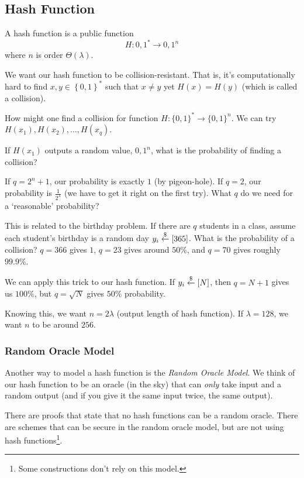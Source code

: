 \subsection{Hash Function}
A hash function is a public function
\[H: {0, 1}^*\to {0, 1}^n\]
where $n$ is order $\Theta(\lambda)$.


We want our hash function to be collision-resistant. That is, it's computationally hard to find $x, y\in\left\{ 0, 1 \right\}^*$ such that $x\neq y$ yet $H(x) = H(y)$ (which is called a collision).

How might one find a collision for function $H: \{ 0, 1 \}^*\to \{ 0, 1 \}^n$. We can try $H(x_1), H(x_2), \dots, H(x_q)$.

If $H(x_1)$ outputs a random value, ${0, 1}^n$, what is the probability of finding a collision?

If $q = 2^n + 1$, our probability is exactly $1$ (by pigeon-hole). If $q = 2$, our probability is $\frac{1}{2^\lambda}$ (we have to get it right on the first try). What $q$ do we need for a `reasonable' probability?

\begin{remark*}
    This is related to the birthday problem. If there are $q$ students in a class, assume each student's birthday is a random day $y_i\overset{\$}{\leftarrow} [365]$. What is the probability of a collision? $q = 366$ gives $1$, $q = 23$ gives around $50\%$, and $q = 70$ gives roughly $99.9\%$.

    We can apply this trick to our hash function. If $y_i\overset{\$}{\leftarrow} [N]$, then $q = N+1$ gives us $100\%$, but $q = \sqrt{N}$ gives $50\%$ probability.
\end{remark*}

Knowing this, we want $n = 2\lambda$ (output length of hash function). If $\lambda = 128$, we want $n$ to be around $256$.

\subsubsection{Random Oracle Model}
Another way to model a hash function is the \emph{Random Oracle Model}. We think of our hash function to be an oracle (in the sky) that can \emph{only} take input and a random output (and if you give it the same input twice, the same output).


There are proofs that state that no hash functions can be a random oracle. There are schemes that can be secure in the random oracle model, but are not using hash functions\footnote{Some constructions don't rely on this model.}.

